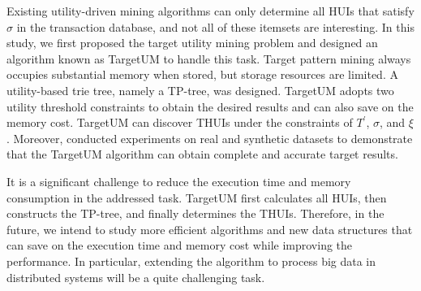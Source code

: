 \documentclass[journal]{IEEEtran}
\begin{document}
Existing utility-driven mining algorithms can only determine all HUIs that satisfy $\sigma$ in the transaction database, and not all of these itemsets are interesting. In this study, we first proposed the target utility mining problem and designed an algorithm known as TargetUM to handle this task. Target pattern mining always occupies substantial memory when stored, but storage resources are limited. A utility-based trie tree, namely a TP-tree, was designed. TargetUM adopts two utility threshold constraints to obtain the desired results and can also save on the memory cost. TargetUM can discover THUIs under the constraints of $T^\prime$, $\sigma$, and $\xi$. Moreover, conducted experiments on real and synthetic datasets to demonstrate that the TargetUM algorithm can obtain complete and accurate target results. 

It is a significant challenge to reduce the execution time and memory consumption in the addressed task. TargetUM first calculates all HUIs, then constructs the TP-tree, and finally determines the THUIs. Therefore, in the future, we intend to study more efficient algorithms and new data structures that can save on the execution time and memory cost while improving the performance. In particular, extending the algorithm to process big data in distributed systems will be a quite challenging task.



\ifCLASSOPTIONcaptionsoff
  \newpage
\fi





\end{document}
